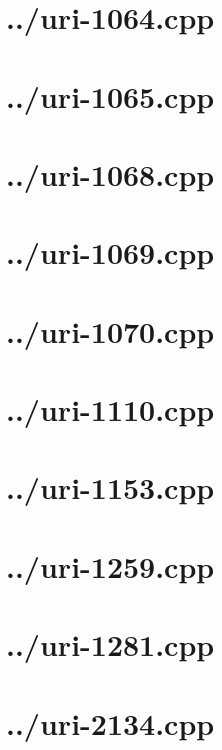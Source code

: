 \documentclass{article}
\begin{document}
\section*{../uri-1064.cpp}


\section*{../uri-1065.cpp}


\section*{../uri-1068.cpp}


\section*{../uri-1069.cpp}


\section*{../uri-1070.cpp}


\section*{../uri-1110.cpp}


\section*{../uri-1153.cpp}


\section*{../uri-1259.cpp}


\section*{../uri-1281.cpp}


\section*{../uri-2134.cpp}

\end{document}
